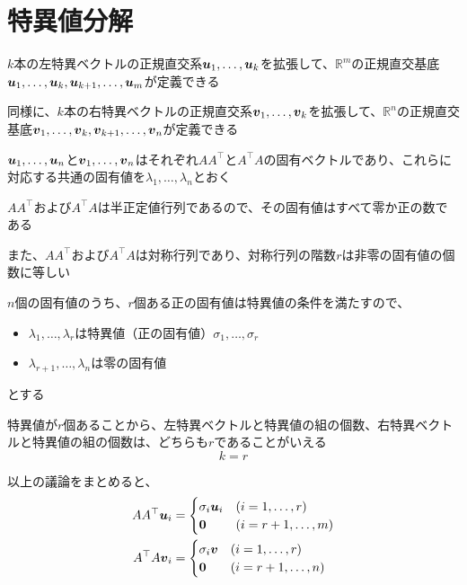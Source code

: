 \documentclass[../../../topic_linear-algebra]{subfiles}
\begin{document}
\sectionline
\section{特異値分解}

$k$本の左特異ベクトルの正規直交系$\vb*{u}_1,\ldots,\vb*{u}_k$を拡張して、$\mathbb{R}^m$の正規直交基底$\vb*{u}_1,\ldots,\vb*{u}_k,\vb*{u}_{k+1},\ldots,\vb*{u}_m$が定義できる

同様に、$k$本の右特異ベクトルの正規直交系$\vb*{v}_1,\ldots,\vb*{v}_k$を拡張して、$\mathbb{R}^n$の正規直交基底$\vb*{v}_1,\ldots,\vb*{v}_k,\vb*{v}_{k+1},\ldots,\vb*{v}_n$が定義できる

\br

$\vb*{u}_1,\ldots,\vb*{u}_n$と$\vb*{v}_1,\ldots,\vb*{v}_n$はそれぞれ$AA^\top$と$A^\top A$の固有ベクトルであり、これらに対応する共通の固有値を$\lambda_1,\ldots,\lambda_n$とおく

\br

$AA^\top$および$A^\top A$は半正定値行列であるので、その固有値はすべて零か正の数である

また、$AA^\top$および$A^\top A$は対称行列であり、対称行列の階数$r$は非零の固有値の個数に等しい

$n$個の固有値のうち、$r$個ある正の固有値は特異値の条件を満たすので、
\begin{itemize}
  \item $\lambda_1,\ldots,\lambda_r$は特異値（正の固有値）$\sigma_1,\ldots,\sigma_r$
  \item $\lambda_{r+1},\ldots,\lambda_{n}$は零の固有値
\end{itemize}
とする

\br

特異値が$r$個あることから、左特異ベクトルと特異値の組の個数、右特異ベクトルと特異値の組の個数は、どちらも$r$であることがいえる
\begin{equation*}
  k = r
\end{equation*}

以上の議論をまとめると、
\begin{align*}
  AA^\top \vb*{u}_i  & = \begin{cases}
                           \sigma_i \vb*{u}_i & (i = 1,\ldots,r)   \\
                           \vb*{0}            & (i = r+1,\ldots,m)
                         \end{cases} \\
  A^\top A \vb*{v}_i & = \begin{cases}
                           \sigma_i \vb*{v} & (i = 1,\ldots, r)   \\
                           \vb*{0}          & (i = r+1,\ldots, n)
                         \end{cases}
\end{align*}
\end{document}
